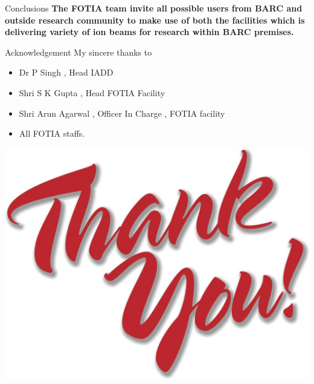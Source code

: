 \documentclass[11pt]{beamer}
\begin{document}
\begin{frame}{Conclusions}
 \textbf{The FOTIA team invite all possible users from BARC and outside research community to make use of both the facilities which is delivering variety of ion beams for research within BARC premises.}\\
 
 
\end{frame}

\begin{frame}{Acknowledgement}
 My sincere thanks to 
 
 
 \begin{center}
  \begin{itemize}
  \item Dr P Singh , Head IADD
  \item Shri S K Gupta , Head FOTIA Facility
  \item Shri Arun Agarwal , Officer In Charge , FOTIA facility
  \item All FOTIA staffs.
  \end{itemize}
\end{center}
\end{frame}

\begin{frame}
\begin{center}
  \includegraphics[scale=0.2]{thank_you.jpg}
  
\end{center}
\end{frame}
\end{document}

